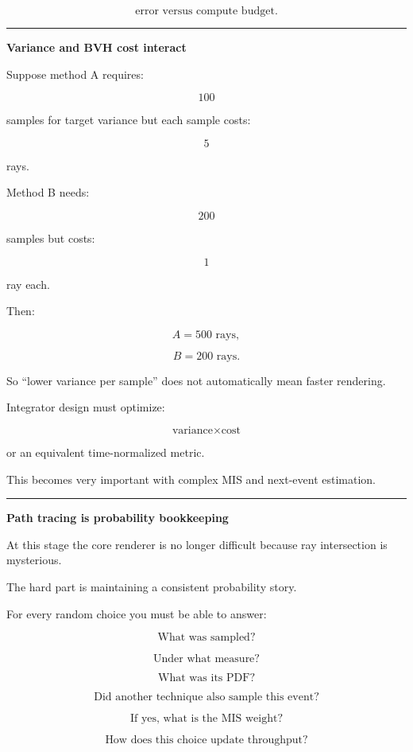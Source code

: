 \[
\boxed{
\text{error versus compute budget}.
}
\]

\begin{center}\rule{0.5\linewidth}{0.5pt}\end{center}

\textbf{Variance and BVH cost interact}

Suppose method A requires:

\[
100
\]

samples for target variance but each sample costs:

\[
5
\]

rays.

Method B needs:

\[
200
\]

samples but costs:

\[
1
\]

ray each.

Then:

\[
A=500\text{ rays},
\]

\[
B=200\text{ rays}.
\]

So ``lower variance per sample'' does not automatically mean faster rendering.

Integrator design must optimize:

\[
\boxed{
\text{variance}\times\text{cost}
}
\]

or an equivalent time-normalized metric.

This becomes very important with complex MIS and next-event estimation.

\begin{center}\rule{0.5\linewidth}{0.5pt}\end{center}

\textbf{Path tracing is probability bookkeeping}

At this stage the core renderer is no longer difficult because ray intersection is mysterious.

The hard part is maintaining a consistent probability story.

For every random choice you must be able to answer:

\[
\text{What was sampled?}
\]

\[
\text{Under what measure?}
\]

\[
\text{What was its PDF?}
\]

\[
\text{Did another technique also sample this event?}
\]

\[
\text{If yes, what is the MIS weight?}
\]

\[
\text{How does this choice update throughput?}
\]


